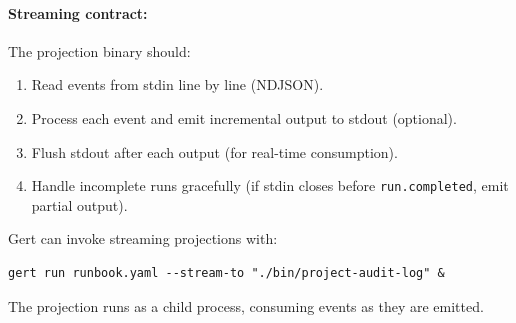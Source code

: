 \paragraph{Streaming contract:}

The projection binary should:

\begin{enumerate}
  \item Read events from stdin line by line (NDJSON).
  \item Process each event and emit incremental output to stdout (optional).
  \item Flush stdout after each output (for real-time consumption).
  \item Handle incomplete runs gracefully (if stdin closes before
    \texttt{run.completed}, emit partial output).
\end{enumerate}

Gert can invoke streaming projections with:

\begin{verbatim}
gert run runbook.yaml --stream-to "./bin/project-audit-log" &
\end{verbatim}

The projection runs as a child process, consuming events as they are emitted.
